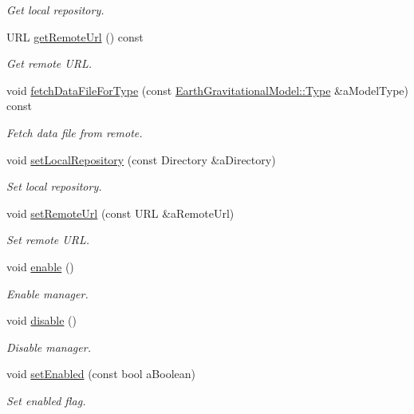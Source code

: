 \begin{DoxyCompactItemize}
\begin{DoxyCompactList}\small\item\em Get local repository. \end{DoxyCompactList}\item 
U\+RL \hyperlink{classostk_1_1physics_1_1environment_1_1gravitational_1_1earth_1_1_manager_aceec32c652632d1d785d1dfbfd655c01}{get\+Remote\+Url} () const
\begin{DoxyCompactList}\small\item\em Get remote U\+RL. \end{DoxyCompactList}\item 
void \hyperlink{classostk_1_1physics_1_1environment_1_1gravitational_1_1earth_1_1_manager_a71c371d5be3ea47f5332dce23bd410c6}{fetch\+Data\+File\+For\+Type} (const \hyperlink{classostk_1_1physics_1_1environment_1_1gravitational_1_1_earth_a9895df78b5c5aab5e981bf765f8c0f05}{Earth\+Gravitational\+Model\+::\+Type} \&a\+Model\+Type) const
\begin{DoxyCompactList}\small\item\em Fetch data file from remote. \end{DoxyCompactList}\item 
void \hyperlink{classostk_1_1physics_1_1environment_1_1gravitational_1_1earth_1_1_manager_aaca1ee2d3cd65105ba5fb4bfb2987589}{set\+Local\+Repository} (const Directory \&a\+Directory)
\begin{DoxyCompactList}\small\item\em Set local repository. \end{DoxyCompactList}\item 
void \hyperlink{classostk_1_1physics_1_1environment_1_1gravitational_1_1earth_1_1_manager_a3b935a28445b47e23e59141e5d3f6f2e}{set\+Remote\+Url} (const U\+RL \&a\+Remote\+Url)
\begin{DoxyCompactList}\small\item\em Set remote U\+RL. \end{DoxyCompactList}\item 
void \hyperlink{classostk_1_1physics_1_1environment_1_1gravitational_1_1earth_1_1_manager_ad2bcfa6c79e5db2c11044f9db028fefa}{enable} ()
\begin{DoxyCompactList}\small\item\em Enable manager. \end{DoxyCompactList}\item 
void \hyperlink{classostk_1_1physics_1_1environment_1_1gravitational_1_1earth_1_1_manager_aa7da60f0a9f7a4482d834dfbf8af9801}{disable} ()
\begin{DoxyCompactList}\small\item\em Disable manager. \end{DoxyCompactList}\item 
void \hyperlink{classostk_1_1physics_1_1environment_1_1gravitational_1_1earth_1_1_manager_a6dd1b7abff1be04e56a8cc4edf55b840}{set\+Enabled} (const bool a\+Boolean)
\begin{DoxyCompactList}\small\item\em Set enabled flag. \end{DoxyCompactList}\end{DoxyCompactItemize}
